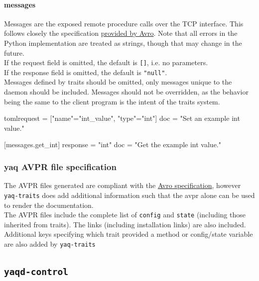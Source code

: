 \hypertarget{messages}{%
\paragraph{messages}\label{messages}}

Messages are the exposed remote procedure calls over the TCP interface.
This follows closely the specification
\href{https://avro.apache.org/docs/current/spec.html\#Messages}{provided
by Avro}. Note that all errors in the Python implementation are treated
as strings, though that may change in the future.\\
If the request field is omitted, the default is \texttt{{[}{]}}, i.e. no
parameters.\\
If the response field is omitted, the default is \texttt{"null"}.\\
Messages defined by traits should be omitted, only messages unique to
the daemon should be included. Messages should not be overridden, as the
behavior being the same to the client program is the intent of the
traits system.

\begin{codefragment}{toml}
request = [{"name"="int_value", "type"="int"}]
doc = "Set an example int value."

[messages.get_int] response = "int"
doc = "Get the example int value."
\end{codefragment}

\hypertarget{yaq-avpr-file-specification}{%
\subsubsection{yaq AVPR file
specification}\label{yaq-avpr-file-specification}}

The AVPR files generated are compliant with the
\href{https://avro.apache.org/docs/current/spec.html\#Protocol+Declaration}{Avro
specification}, however \texttt{yaq-traits} does add additional
information such that the avpr alone can be used to render the
documentation.\\
The AVPR files include the complete list of \texttt{config} and
\texttt{state} (including those inherited from traits). The links
(including installation links) are also included. Additional keys
specifying which trait provided a method or config/state variable are
also added by \texttt{yaq-traits}


\subsection{\texttt{yaqd-control}}

